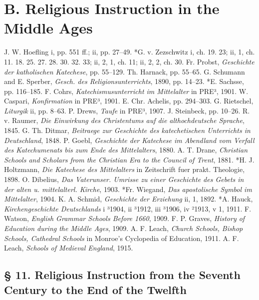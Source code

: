 \chapter{B. Religious Instruction in the Middle Ages}

J. W. Hoefling i, pp. 551 ff.; ii, pp. 27–49. *G. v. Zezschwitz i, ch. 19. 23; ii, 1, ch. 11. 18. 25. 27. 28. 30. 32. 33; ii, 2, 1, ch. 11; ii, 2, 2, ch. 30. Fr. Probst, \emph{Geschichte der katholischen Katechese}, pp. 55–129. Th. Harnack, pp. 55–65. G. Schumann and E. Sperber, \emph{Gesch. des Religionsunterrichts}, 1890, pp. 14–23. *E. Sachsse, pp. 116–185. F. Cohrs, \emph{Katechismusunterricht im Mittelalter} in PRE³, 1901. W. Caspari, \emph{Konfirmation} in PRE³, 1901. E. Chr. Achelis, pp. 294–303. G. Rietschel, \emph{Liturgik} ii, pp. 8–63. P. Drews, \emph{Taufe} in PRE³, 1907. J. Steinbeck, pp. 10–26. R. v. Raumer, \emph{Die Einwirkung des Christentums auf die althochdeutsche Sprache}, 1845. G. Th. Ditmar, \emph{Beitraege zur Geschichte des katechetischen Unterrichts in Deutschland}, 1848. P. Goebl, \emph{Geschichte der Katechese im Abendland vom Verfall des Katechumenats bis zum Ende des Mittelalters}, 1880. A. T. Drane, \emph{Christian Schools and Scholars from the Christian Era to the Council of Trent}, 1881. *H. J. Holtzmann, \emph{Die Katechese des Mittelalters} in Zeitschrift fuer prakt. Theologie, 1898. O. Dibelius, \emph{Das Vaterunser. Umrisse zu einer Geschichte des Gebets in der alten u. mittelalterl. Kirche}, 1903. *Fr. Wiegand, \emph{Das apostolische Symbol im Mittelalter}, 1904. K. A. Schmid, \emph{Geschichte der Erziehung} ii, 1, 1892. *A. Hauck, \emph{Kirchengeschichte Deutschlands} i ³1904, ii ³1912, iii ³1906, iv ²1913, v 1, 1911. F. Watson, \emph{English Grammar Schools Before 1660}, 1909. F. P. Graves, \emph{History of Education during the Middle Ages}, 1909. A. F. Leach, \emph{Church Schools, Bishop Schools, Cathedral Schools} in Monroe’s Cyclopedia of Education, 1911. A. F. Leach, \emph{Schools of Medieval England}, 1915.

\section[§ 11. From the Seventh Century]{§ 11. Religious Instruction from the Seventh Century to the End of the Twelfth}

